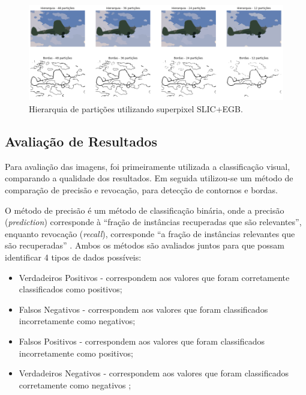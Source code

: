 \begin{document}
\begin{figure}[ht]
\centering
\includegraphics[width=1.\textwidth]{slic_hierarquia_particoes.png}
\caption{Hierarquia de partições utilizando superpixel SLIC+EGB.}
\label{fig:hierarq_partit}
\end{figure}



\subsection{Avaliação de Resultados} \label{ssec:aval_resultados}

Para avaliação das imagens, foi primeiramente utilizada a classificação visual, comparando a qualidade dos resultados. Em seguida utilizou-se um método de comparação de precisão e revocação, para detecção de contornos e bordas.

O método de precisão é um método de classificação binária, onde a precisão (\textit{prediction}) corresponde à ``fração de instâncias recuperadas que são relevantes'', enquanto revocação (\textit{recall}), corresponde ``a fração de instâncias relevantes que são recuperadas'' \cite{WIKI_PREC_RECALL}. Ambos os métodos são avaliados juntos para que possam identificar 4 tipos de dados possíveis:

\begin{itemize}
 \item Verdadeiros Positivos - correspondem aos valores que foram corretamente classificados como positivos;
 \item Falsos Negativos - correspondem aos valores que foram classificados incorretamente como negativos;
 \item Falsos Positivos - correspondem aos valores que foram classificados incorretamente como positivos;
 \item Verdadeiros Negativos - correspondem aos valores que foram classificados corretamente como negativos \cite{WIKI_PREC_RECALL};
\end{itemize}
\end{document}
